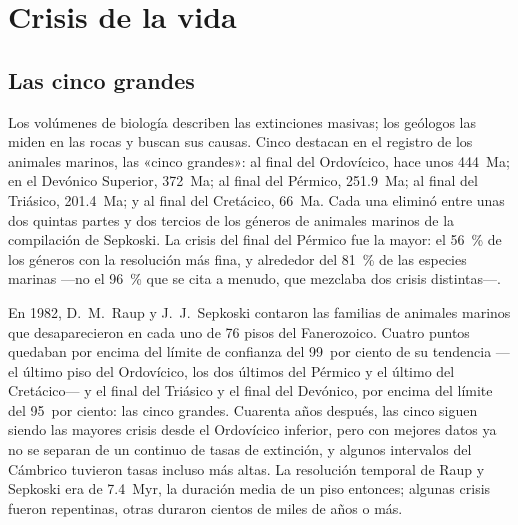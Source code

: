 \section{Crisis de la vida}\label{sec:b2:phanerozoic-earth:extinctions}

\subsection*{Las cinco grandes}

Los volúmenes de biología describen las extinciones masivas; los geólogos las miden en las rocas y buscan
sus causas. Cinco destacan en el registro de los animales marinos, las «cinco grandes»: al final del
Ordovícico, hace unos \qty{444}{Ma}; en el Devónico Superior, \qty{372}{Ma}; al final del Pérmico,
\qty{251.9}{Ma}; al final del Triásico, \qty{201.4}{Ma}; y al final del Cretácico,
\qty{66}{Ma}. Cada una eliminó entre unas dos quintas partes y dos tercios de los géneros de animales
marinos de la compilación de Sepkoski. La crisis del final del Pérmico fue la mayor: el \qty{56}{\percent} de los
géneros con la resolución más fina, y alrededor del \qty{81}{\percent} de las especies marinas ---no el
\qty{96}{\percent} que se cita a menudo, que mezclaba dos crisis distintas---.

\begin{history}
En 1982, D.~M.~Raup y J.~J.~Sepkoski contaron las familias de animales marinos que desaparecieron
en cada uno de 76 pisos del Fanerozoico. Cuatro puntos quedaban por encima del límite de confianza del 99~por ciento
de su tendencia ---el último piso del Ordovícico, los dos últimos del Pérmico y el último del
Cretácico--- y el final del Triásico y el final del Devónico, por encima del límite del 95~por
ciento: las cinco grandes. Cuarenta años después, las cinco siguen siendo las mayores crisis desde el Ordovícico
inferior, pero con mejores datos ya no se separan de un continuo de tasas de
extinción, y algunos intervalos del Cámbrico tuvieron tasas incluso más altas. La resolución temporal de Raup y Sepkoski
era de \qty{7.4}{Myr}, la duración media de un piso entonces; algunas crisis fueron repentinas, otras
duraron cientos de miles de años o más.
\end{history}

